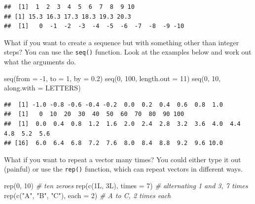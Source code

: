 \documentclass[
  oneside]{book}
\newenvironment{Shaded}{\begin{snugshade}}{\end{snugshade}}
\newcommand{\AttributeTok}[1]{\textcolor[rgb]{0.77,0.63,0.00}{#1}}
\newcommand{\CommentTok}[1]{\textcolor[rgb]{0.56,0.35,0.01}{\textit{#1}}}
\newcommand{\DecValTok}[1]{\textcolor[rgb]{0.00,0.00,0.81}{#1}}
\newcommand{\FloatTok}[1]{\textcolor[rgb]{0.00,0.00,0.81}{#1}}
\newcommand{\FunctionTok}[1]{\textcolor[rgb]{0.00,0.00,0.00}{#1}}
\newcommand{\NormalTok}[1]{#1}
\newcommand{\SpecialCharTok}[1]{\textcolor[rgb]{0.00,0.00,0.00}{#1}}
\newcommand{\StringTok}[1]{\textcolor[rgb]{0.31,0.60,0.02}{#1}}
\begin{document}
\begin{verbatim}
##  [1]  1  2  3  4  5  6  7  8  9 10
## [1] 15.3 16.3 17.3 18.3 19.3 20.3
##  [1]   0  -1  -2  -3  -4  -5  -6  -7  -8  -9 -10
\end{verbatim}

What if you want to create a sequence but with something other than integer steps? You can use the \texttt{seq()} function. Look at the examples below and work out what the arguments do.

\begin{Shaded}
\begin{Highlighting}[]
\FunctionTok{seq}\NormalTok{(}\AttributeTok{from =} \SpecialCharTok{{-}}\DecValTok{1}\NormalTok{, }\AttributeTok{to =} \DecValTok{1}\NormalTok{, }\AttributeTok{by =} \FloatTok{0.2}\NormalTok{)}
\FunctionTok{seq}\NormalTok{(}\DecValTok{0}\NormalTok{, }\DecValTok{100}\NormalTok{, }\AttributeTok{length.out =} \DecValTok{11}\NormalTok{)}
\FunctionTok{seq}\NormalTok{(}\DecValTok{0}\NormalTok{, }\DecValTok{10}\NormalTok{, }\AttributeTok{along.with =}\NormalTok{ LETTERS)}
\end{Highlighting}
\end{Shaded}

\begin{verbatim}
##  [1] -1.0 -0.8 -0.6 -0.4 -0.2  0.0  0.2  0.4  0.6  0.8  1.0
##  [1]   0  10  20  30  40  50  60  70  80  90 100
##  [1]  0.0  0.4  0.8  1.2  1.6  2.0  2.4  2.8  3.2  3.6  4.0  4.4  4.8  5.2  5.6
## [16]  6.0  6.4  6.8  7.2  7.6  8.0  8.4  8.8  9.2  9.6 10.0
\end{verbatim}

What if you want to repeat a vector many times? You could either type it out (painful) or use the \texttt{rep()} function, which can repeat vectors in different ways.

\begin{Shaded}
\begin{Highlighting}[]
\FunctionTok{rep}\NormalTok{(}\DecValTok{0}\NormalTok{, }\DecValTok{10}\NormalTok{)                      }\CommentTok{\# ten zeroes}
\FunctionTok{rep}\NormalTok{(}\FunctionTok{c}\NormalTok{(1L, 3L), }\AttributeTok{times =} \DecValTok{7}\NormalTok{)       }\CommentTok{\# alternating 1 and 3, 7 times}
\FunctionTok{rep}\NormalTok{(}\FunctionTok{c}\NormalTok{(}\StringTok{"A"}\NormalTok{, }\StringTok{"B"}\NormalTok{, }\StringTok{"C"}\NormalTok{), }\AttributeTok{each =} \DecValTok{2}\NormalTok{) }\CommentTok{\# A to C, 2 times each}
\end{Highlighting}
\end{Shaded}
\end{document}
